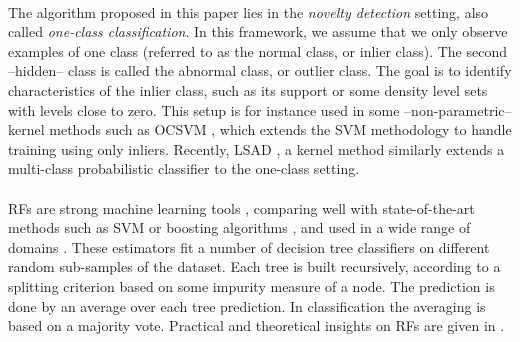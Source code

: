 \paragraph{}
The algorithm proposed in this paper lies in the \emph{novelty detection}
setting, also called %
\emph{one-class classification}. In this framework, we assume that we only
observe examples of one class (referred to as the normal class, or inlier
class). The second --hidden-- class is called the abnormal class, or outlier
class.
The goal is to identify characteristics of the inlier class, such as its
support or some density level sets with levels close to zero.
%
This setup is for instance used in some --non-parametric-- kernel methods such
as \ac{OCSVM} \citep{Scholkopf2001}, which
extends the \ac{SVM} methodology \citep{Cortes1995,Shawe2004} to handle
training using only inliers.  Recently, \ac{LSAD} \citep{Quinn2014}, a kernel
method similarly extends a multi-class probabilistic classifier
\citep{Sugiyama2010} to the one-class setting.
%

\paragraph{}
\acp{RF} are strong machine learning tools \citep{Breiman2001}, comparing well
with state-of-the-art methods such as \ac{SVM} or boosting algorithms
\citep{Freund1996}, and used in a wide range of domains \citep{Svetnik2003,
Diaz2006, Genuer2010}. These estimators fit a number of decision tree
classifiers on different random sub-samples of the dataset.  Each tree is built
recursively, according to a splitting criterion based on some impurity measure
of a node.  The prediction is done by an average over each tree prediction.  In
classification the averaging is based on a majority vote. %
Practical and theoretical insights on \acp{RF} are given in \citet{Genuer2008,
Biau2008, Louppe2014, Biau2016}.
